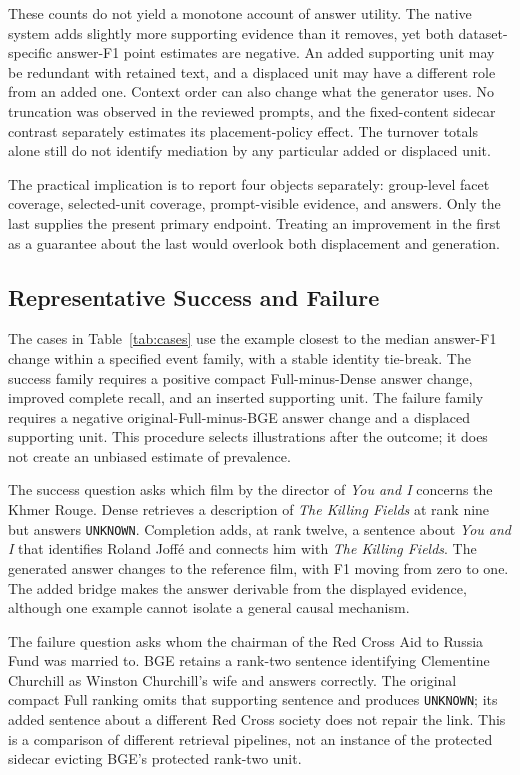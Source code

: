 \documentclass[11pt,a4paper]{article}
\begin{document}
These counts do not yield a monotone account of answer utility. The native
system adds slightly more supporting evidence than it removes, yet both
dataset-specific answer-F1 point estimates are negative. An added supporting
unit may be redundant with retained text, and a displaced unit may have a
different role from an added one. Context order can also change what the
generator uses. No truncation was observed in the reviewed prompts, and the
fixed-content sidecar contrast separately estimates its placement-policy
effect. The turnover totals alone still do not identify mediation by any
particular added or displaced unit.

The practical implication is to report four objects separately: group-level
facet coverage, selected-unit coverage, prompt-visible evidence, and answers.
Only the last supplies the present primary endpoint. Treating an improvement
in the first as a guarantee about the last would overlook both displacement
and generation.

\subsection{Representative Success and Failure}
The cases in Table~\ref{tab:cases} use the example closest to the median
answer-F1 change within a specified event family, with a stable identity
tie-break. The success family requires a positive compact Full-minus-Dense
answer change, improved complete recall, and an inserted supporting unit.
The failure family requires a negative original-Full-minus-BGE answer change
and a displaced supporting unit. This procedure selects illustrations after
the outcome; it does not create an unbiased estimate of prevalence.

The success question asks which film by the director of \emph{You and I}
concerns the Khmer Rouge. Dense retrieves a description of \emph{The Killing
Fields} at rank nine but answers \texttt{UNKNOWN}. Completion adds, at rank
twelve, a sentence about \emph{You and I} that identifies Roland Joff\'e and
connects him with \emph{The Killing Fields}. The generated answer changes to
the reference film, with F1 moving from zero to one.
The added bridge makes the answer derivable from the displayed evidence,
although one example cannot isolate a general causal mechanism.

The failure question asks whom the chairman of the Red Cross Aid to Russia
Fund was married to. BGE retains a rank-two sentence identifying Clementine
Churchill as Winston Churchill's wife and answers correctly. The original
compact Full ranking omits that supporting sentence and produces
\texttt{UNKNOWN}; its added sentence about a different Red Cross society
does not repair the link. This is a comparison of different retrieval
pipelines, not an instance of the protected sidecar evicting BGE's protected
rank-two unit.
\end{document}
